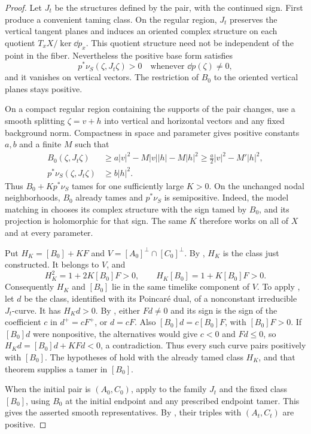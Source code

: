 \begin{proof}
Let $J_t$ be the structures defined by the pair, with the continued
sign.  First produce a convenient taming class.  On the regular region,
$J_t$ preserves the vertical tangent planes and induces an oriented
complex structure on each quotient $T_xX/\ker\dd p_x$.  This quotient
structure need not be independent of the point in the fiber.  Nevertheless
the positive base form satisfies
\[
 p^*\nu_S(\zeta,J_t\zeta)>0
 \quad\text{whenever }\dd p(\zeta)\ne0,
\]
and it vanishes on vertical vectors.  The restriction of $B_0$ to the
oriented vertical planes stays positive.

On a compact regular region containing the supports of the pair
changes, use a smooth splitting $\zeta=v+h$ into vertical and
horizontal vectors and any fixed background norm.  Compactness in
space and parameter gives positive constants $a,b$ and a finite $M$
such that
\begin{align*}
 B_0(\zeta,J_t\zeta)&\ge a|v|^2-M|v||h|-M|h|^2
                       \ge \tfrac a2|v|^2-M'|h|^2,\\
 p^*\nu_S(\zeta,J_t\zeta)&\ge b|h|^2.
\end{align*}
Thus $B_0+Kp^*\nu_S$ tames for one sufficiently large $K>0$.
On the unchanged nodal neighborhoods, $B_0$ already tames and
$p^*\nu_S$ is semipositive.  Indeed, the model matching in
 chooses its complex structure with the
sign tamed by $B_0$, and its projection is holomorphic for that sign.
The same $K$ therefore works on all of $X$ and at every parameter.

Put $H_K=[B_0]+KF$ and
$V=[A_0]^\perp\cap[C_0]^\perp$.  By
, $H_K$ is the class just constructed.
It belongs to $V$, and
\[
 H_K^2=1+2K[B_0]F>0,\qquad
 H_K[B_0]=1+K[B_0]F>0.
\]
Consequently $H_K$ and $[B_0]$ lie in the same timelike component of
$V$.  To apply , let $d$ be the class, identified
with its Poincar\'e dual, of a nonconstant irreducible $J_t$-curve.
It has $H_Kd>0$.  By , either $Fd\ne0$ and its
sign is the sign of the coefficient $c$ in $d^+=cF^+$, or $d=cF$.
Also $[B_0]d=c[B_0]F$, with $[B_0]F>0$.  If $[B_0]d$ were
nonpositive, the alternatives would give $c<0$ and $Fd\le0$, so
$H_Kd=[B_0]d+KFd<0$, a contradiction.  Thus every such curve pairs
positively with $[B_0]$.  The hypotheses of
 hold with the already tamed class $H_K$, and that
theorem supplies a tamer in $[B_0]$.

When the initial pair is $(A_0,C_0)$, apply 
to the family $J_t$ and the fixed class $[B_0]$, using $B_0$ at the
initial endpoint and any prescribed endpoint tamer.  This gives the
asserted smooth representatives.
By , their triples with $(A_t,C_t)$ are positive.
\end{proof}

